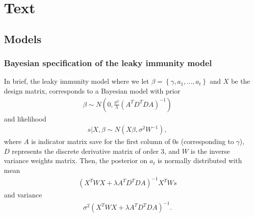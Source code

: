 \documentclass{article}
\begin{document}
\section{Text}  
\subsection{Models}
\subsubsection{Bayesian specification of the leaky immunity
model}\label{supp:bayesleaky} In brief, the leaky immunity model where we let
$\beta = \left \{  \gamma, a_1,\dots, a_t \right \}$ and $X$ be the design
matrix, corresponds to a Bayesian model with prior 
\begin{align*}
    \beta \sim N \left( 0,  \frac{\sigma^2 }{ \lambda} \left( A^TD^TDA 
    \right)^{-1}  \right)
\end{align*} and likelihood 
\begin{align*}
    s|X,\beta \sim N \left( X\beta, \sigma^2W^{-1} \right),
\end{align*} where $A$ is indicator matrix save for the first column of $0$s 
(corresponding to $\gamma$), $D$ represents the discrete derivative matrix of 
order $3$, and $W$ is the inverse variance weights matrix. Then, the posterior 
on $a_t$ is normally distributed with mean 
\begin{align*}
    \left ( X^TWX + \lambda A^TD^TDA \right )^{-1}X^TWs
\end{align*} 
and variance 
\begin{align*}
    \sigma^2 (X^TWX + \lambda A^TD^TDA)^{-1}.
\end{align*}
\end{document}
